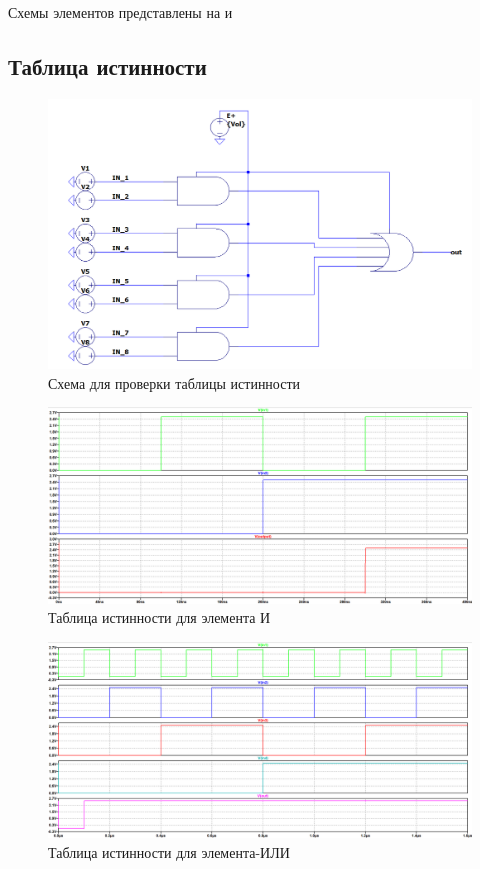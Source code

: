 \documentclass[a4paper,14pt]{article}
\begin{document}
Схемы элементов представлены на  и 

\subsection{Таблица истинности}

\begin{figure}[H]
	\centering		
	\includegraphics[width=\linewidth]{image/schema_all}
	\caption{Схема для проверки таблицы истинности}\label{img:schema_all}
\end{figure}


\begin{figure}[H]
	\centering		
	\includegraphics[width=\linewidth]{image/spice_and_bin}
	\caption{Таблица истинности для элемента И}\label{img:spice_and_bin}
\end{figure}


\begin{figure}[H]
	\centering		
	\includegraphics[width=\linewidth]{image/spice_or_bin}
	\caption{Таблица истинности для элемента-ИЛИ }\label{img:spice_or_bin}
\end{figure}
\end{document}
